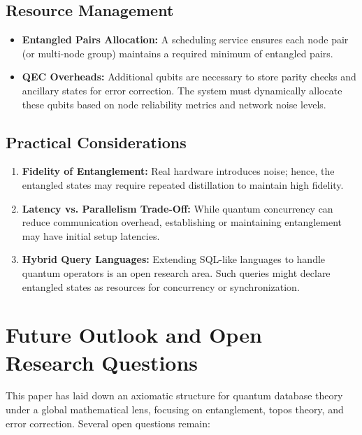 \documentclass[12pt]{article}
\theoremstyle{definition}
\theoremstyle{remark}
\begin{document}
\subsection{Resource Management}
\begin{itemize}
    \item \textbf{Entangled Pairs Allocation:} A scheduling service ensures each node pair (or multi-node group) maintains a required minimum of entangled pairs. 
    \item \textbf{QEC Overheads:} Additional qubits are necessary to store parity checks and ancillary states for error correction. The system must dynamically allocate these qubits based on node reliability metrics and network noise levels.
\end{itemize}

\subsection{Practical Considerations}
\begin{enumerate}[label=(\alph*)]
    \item \textbf{Fidelity of Entanglement:} Real hardware introduces noise; hence, the entangled states may require repeated distillation to maintain high fidelity.
    \item \textbf{Latency vs. Parallelism Trade-Off:} While quantum concurrency can reduce communication overhead, establishing or maintaining entanglement may have initial setup latencies.
    \item \textbf{Hybrid Query Languages:} Extending SQL-like languages to handle quantum operators is an open research area. Such queries might declare entangled states as resources for concurrency or synchronization.
\end{enumerate}

\section{Future Outlook and Open Research Questions}
\label{sec:conclusion}
This paper has laid down an axiomatic structure for quantum database theory under a global mathematical lens, focusing on entanglement, topos theory, and error correction. Several open questions remain:
\end{document}
